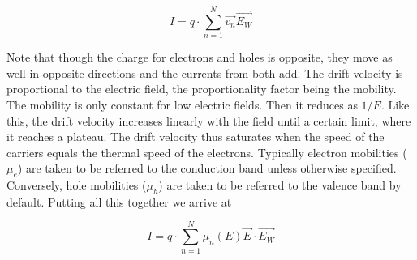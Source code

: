 \begin{equation}
	I = q \cdot \sum_{n=1}^{N} \overrightarrow {v_n}\overrightarrow {E_{W}} 	\label{eq:ramoTot} 
\end{equation} 

Note that though the charge for electrons and holes is opposite, they move as
well in opposite directions and the currents from both add. The drift velocity 
is proportional to the electric field, the proportionality factor being 
the mobility. The mobility is only constant for low electric fields. Then 
it reduces as $1/E$. Like this, the drift velocity increases linearly with 
the field until a certain limit, where it reaches a plateau. The drift 
velocity thus saturates when the speed of the carriers equals the thermal 
speed of the electrons. Typically electron mobilities ($ \mu_e $) are taken to 
be referred to the conduction band unless otherwise specified. Conversely, 
hole mobilities ($ \mu_h $) are taken to be referred to the valence band 
by default. Putting all this together we arrive at 

\begin{equation}
	I = q \cdot \sum_{n=1}^{N} \mu_n(E) \overrightarrow {E} \cdot \overrightarrow {E_{W}} 
\label{eq:ramoMob}
\end{equation}


